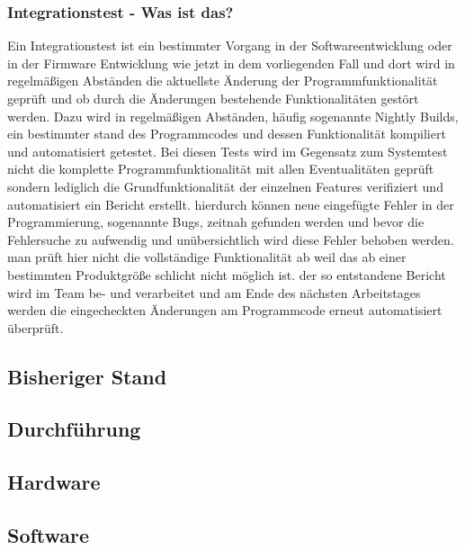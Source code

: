 \subsubsection{Integrationstest - Was ist das?}
Ein Integrationstest ist ein bestimmter Vorgang in der Softwareentwicklung oder in der Firmware Entwicklung wie jetzt in dem vorliegenden Fall und dort wird in regelmäßigen Abständen die aktuellste Änderung der Programmfunktionalität geprüft und ob durch die Änderungen bestehende Funktionalitäten gestört werden. Dazu wird in regelmäßigen Abständen, häufig sogenannte Nightly Builds,  ein bestimmter stand des Programmcodes und dessen Funktionalität kompiliert und automatisiert getestet. Bei diesen Tests wird im Gegensatz zum Systemtest nicht die komplette Programmfunktionalität mit allen Eventualitäten geprüft sondern lediglich die Grundfunktionalität der einzelnen Features verifiziert und automatisiert ein Bericht erstellt. hierdurch können neue eingefügte Fehler in der Programmierung, sogenannte Bugs, zeitnah gefunden werden und bevor die Fehlersuche zu aufwendig und unübersichtlich wird diese Fehler behoben werden. man prüft hier nicht die vollständige Funktionalität ab weil das ab einer bestimmten Produktgröße schlicht nicht möglich ist. der so entstandene Bericht wird im Team be- und verarbeitet und am Ende des nächsten Arbeitstages werden die eingecheckten Änderungen am Programmcode erneut automatisiert überprüft.

\subsection{Bisheriger Stand}
\subsection{Durchführung}
\subsection{Hardware}
\subsection{Software}

